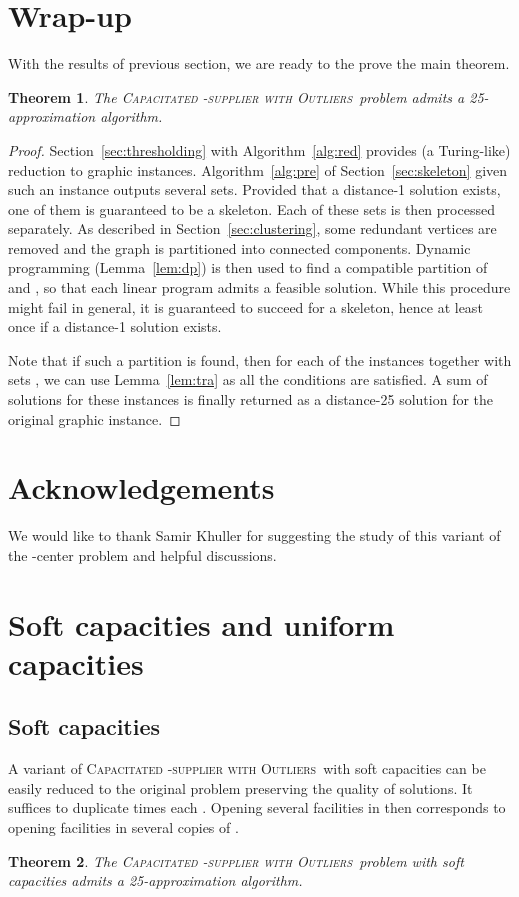 \documentclass{article}
\newcommand{\fullsup}{\textsc{Capacitated} -\textsc{supplier with Outliers}}
\theoremstyle{plain}
\newtheorem{theorem}{Theorem}
\theoremstyle{definition}
\begin{document}
\section{Wrap-up}
\label{sec:wrap-up}

With the results of previous section, we are ready to the prove the
main theorem.
\begin{theorem}\label{thm:gen}
The \fullsup\  problem admits a 25-approximation algorithm.
\end{theorem}
\begin{proof}
Section~\ref{sec:thresholding} with Algorithm~\ref{alg:red} provides (a Turing-like)
reduction to graphic instances. 
Algorithm~\ref{alg:pre} of Section~\ref{sec:skeleton} given such an instance outputs several sets. 
Provided that a distance-1 solution exists, one of them is guaranteed to
be a skeleton. Each of these sets is then processed separately. As described
in Section~\ref{sec:clustering}, some redundant vertices are removed and the graph is
partitioned into connected components. Dynamic programming (Lemma~\ref{lem:dp})
is then used to find a compatible partition of  and , 
so that each linear program  admits a feasible solution.
While this procedure might fail in general, it is guaranteed to succeed for a skeleton, hence at least once if a distance-1 solution exists. 


Note that if such a partition is found, then for each
of the instances  together with sets ,
we can use Lemma~\ref{lem:tra} as all the conditions  are satisfied.
A sum of solutions for these  instances is finally
returned as a distance-25 solution for the original graphic instance.
\end{proof}

\section*{Acknowledgements}

We would like to thank Samir Khuller for suggesting the study of this variant
of the -{\sc center} problem and helpful discussions.





\newpage
\appendix

\section{Soft capacities and uniform capacities}\label{sec:improvements}
\label{app:improvements}
\subsection{Soft capacities}
A variant of \fullsup\ with soft capacities can be easily reduced to the
original problem preserving the quality of solutions.
It suffices to duplicate  times each .
Opening several facilities in  then corresponds to opening facilities in
several copies of .
\begin{theorem}
The \fullsup\  problem with soft capacities admits a 25-approximation algorithm.
\end{theorem}
\end{document}
